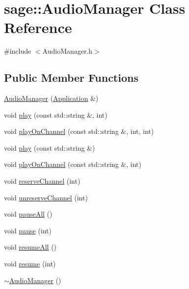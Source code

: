 \hypertarget{classsage_1_1AudioManager}{}\section{sage\+::Audio\+Manager Class Reference}
\label{classsage_1_1AudioManager}


{\ttfamily \#include $<$Audio\+Manager.\+h$>$}

\subsection*{Public Member Functions}
\begin{DoxyCompactItemize}
\item 
\mbox{\hyperlink{classsage_1_1AudioManager_a20f39b8bf96f29d6b5a56bfe05f2baf3}{Audio\+Manager}} (\mbox{\hyperlink{classsage_1_1Application}{Application}} \&)
\item 
void \mbox{\hyperlink{classsage_1_1AudioManager_a251df80c76c4c4031015c4681a2d0c0f}{play}} (const std\+::string \&, int)
\item 
void \mbox{\hyperlink{classsage_1_1AudioManager_a8393c79d76763795c835c0a636a8a8f3}{play\+On\+Channel}} (const std\+::string \&, int, int)
\item 
void \mbox{\hyperlink{classsage_1_1AudioManager_a09ed800755c7d35a12a889319494b798}{play}} (const std\+::string \&)
\item 
void \mbox{\hyperlink{classsage_1_1AudioManager_a928db254848a8eb2536ba065a0b719d3}{play\+On\+Channel}} (const std\+::string \&, int)
\item 
void \mbox{\hyperlink{classsage_1_1AudioManager_a02e449fb8c3d797336a17781a4d1abd4}{reserve\+Channel}} (int)
\item 
void \mbox{\hyperlink{classsage_1_1AudioManager_a96ab7e1b8ea7f52a6cd09675efb042eb}{unreserve\+Channel}} (int)
\item 
void \mbox{\hyperlink{classsage_1_1AudioManager_aae16a9d852718c100659b185f86533b3}{pause\+All}} ()
\item 
void \mbox{\hyperlink{classsage_1_1AudioManager_a6e851147d522d6dc255fc0b1f0134832}{pause}} (int)
\item 
void \mbox{\hyperlink{classsage_1_1AudioManager_a295fca304a8dbd5d1e3c788a20d8e838}{resume\+All}} ()
\item 
void \mbox{\hyperlink{classsage_1_1AudioManager_a694c3a19eed23e395d3d03a9b4af5cdc}{resume}} (int)
\item 
\mbox{\hyperlink{classsage_1_1AudioManager_ad94dc46723c6d7cf8c81fc3772a842aa}{$\sim$\+Audio\+Manager}} ()
\end{DoxyCompactItemize}
